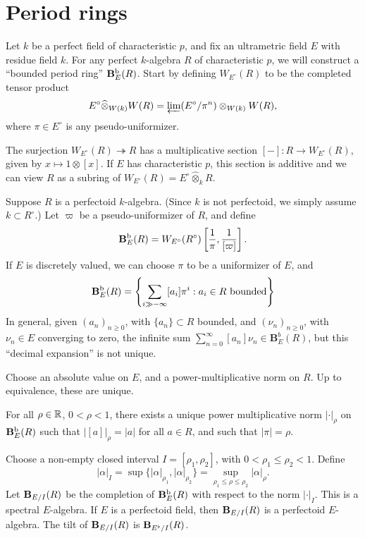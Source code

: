 \documentclass{article}
\begin{document}
\section{Period rings}

Let $k$ be a perfect field of characteristic $p$, and fix an ultrametric field 
$E$ with residue field $k$. For any perfect $k$-algebra $R$ of characteristic 
$p$, we will construct a ``bounded period ring'' $\mathbf{B}_E^\text{b}(R)$. Start by 
defining $W_{E^\circ}(R)$ to be the completed tensor product 
\[
  E^\circ\widehat\otimes_{W(k)} W(R) = \varprojlim (E^\circ/\pi^n)\otimes_{W(k)} W(R) ,
\]
where $\pi\in E^\circ$ is any pseudo-uniformizer. 

The surjection $W_{E^\circ}(R) \twoheadrightarrow R$ has a multiplicative 
section $[-]:R\to W_{E^\circ}(R)$, given by $x\mapsto 1\otimes [x]$. If $E$ 
has characteristic $p$, this section is additive and we can view $R$ as a 
subring of $W_{E^\circ}(R) = E^\circ\widehat\otimes_k R$. 

Suppose $R$ is a perfectoid $k$-algebra. (Since $k$ is not perfectoid, we simply 
assume $k\subset R^\circ$.) Let $\varpi$ be a pseudo-uniformizer of $R$, and 
define 
\[
  \mathbf{B}_E^\text{b}(R) = W_{E^\circ}(R^\circ)\left[\frac 1 \pi, \frac{1}{[\varpi]}\right] .
\]
If $E$ is discretely valued, we can choose $\pi$ to be a uniformizer of $E$, 
and  
\[
  \mathbf{B}_E^\text{b}(R) = \left\{\sum_{i\gg -\infty} [a_i] \pi^i: a_i\in R\text{ bounded}\right\}
\]
In general, given $(a_n)_{n\geqslant 0}$, with $\{a_n\}\subset R$ bounded, and 
$(\nu_n)_{n\geqslant 0}$, with $\nu_n\in E$ converging to zero, the infinite sum 
$\sum_{n=0}^\infty [a_n] \nu_n \in \mathbf B_E^b(R)$, but this ``decimal expansion'' 
is not unique. 

Choose an absolute value on $E$, and a power-multiplicative norm on $R$. Up to 
equivalence, these are unique. 

\begin{proposition}
For all $\rho\in \mathbb{R}$, $0<\rho<1$, there exists a unique power multiplicative norm 
$|\cdot |_\rho$ on $\mathbf{B}_E^\textnormal{b}(R)$ such that 
$|[a]|_\rho = |a|$ for all $a\in R$, and such that $|\pi|=\rho$. 
\end{proposition}

Choose a non-empty closed interval $I=[\rho_1,\rho_2]$, with 
$0<\rho_1\leqslant \rho_2<1$. Define 
\[
  |\alpha|_I = \sup\{|\alpha|_{\rho_1},|\alpha|_{\rho_2}\} = \sup_{\rho_1\leqslant \rho\leqslant \rho_2} |\alpha|_\rho .
\]
Let $\mathbf{B}_{E/I}(R)$ be the completion of $\mathbf{B}_E^\text{b}(R)$ with respect to 
the norm $|\cdot |_I$. This is a spectral $E$-algebra. If $E$ is a perfectoid 
field, then $\mathbf{B}_{E/I}(R)$ is a perfectoid $E$-algebra. The tilt of 
$\mathbf{B}_{E/I}(R)$ is $\mathbf{B}_{E^\flat/I}(R)$. 
\end{document}
